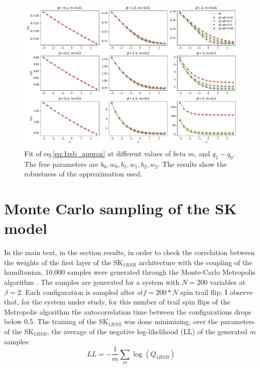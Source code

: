 \documentclass[10pt, notitlepage]{revtex4-2}
\begin{document}
\begin{figure}[h]
    \centering
    \includegraphics[width=1\textwidth]{img/fit_1rsb.pdf}
    \caption{Fit of eq.\ref{eq:1rsb_approx} at different values of $beta$ $m$, and $q_1 - q_0$. The free parameters are $b_0, w_0, b_1, w_1, b_2, w_2$. The results show the robustness of the approximation used. }
    \label{fig:1rsb_approx}
\end{figure}


\section{Monte Carlo sampling of the SK model}
In the main text, in the section results, in order to check the correlation between the weights of the first layer of the SK$_{1RSB}$ architecture with the coupling of the hamiltonian, 10,000 samples were generated through the Monte-Carlo Metropolis algorithm \cite{doi:10.1063/1.1887186}. The samples are generated for a system with $N=200$ variables at $\beta=2$. Each configuration is sampled after $stf = 200*N$ spin trail flip.  I observe that, for the system under study, for this number of trail spin flips of the Metropolis algorithm the autocorrelation time between the configurations drops below 0.5. The training of the SK$_{1RSB}$ was done minimizing, over the parameters of the SK$_{1RSB}$, the average of the negative log-likelihood (LL) of the generated $m$ samples:
\begin{equation}
    LL = - \frac{1}{m} \sum_{m}\log(Q_{1RSB})
\end{equation}  
\end{document}
